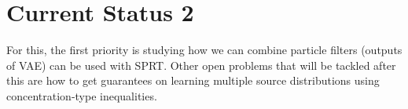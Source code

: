 \documentclass[english]{article}
\numberwithin{equation}{section}
\begin{document}
\section*{Current Status 2}

For this, the first priority is studying how we can combine particle filters (outputs of VAE) can be used with SPRT. Other open problems that will be tackled after this are how to get guarantees on learning multiple source distributions using concentration-type inequalities.
%
%
\end{document}
